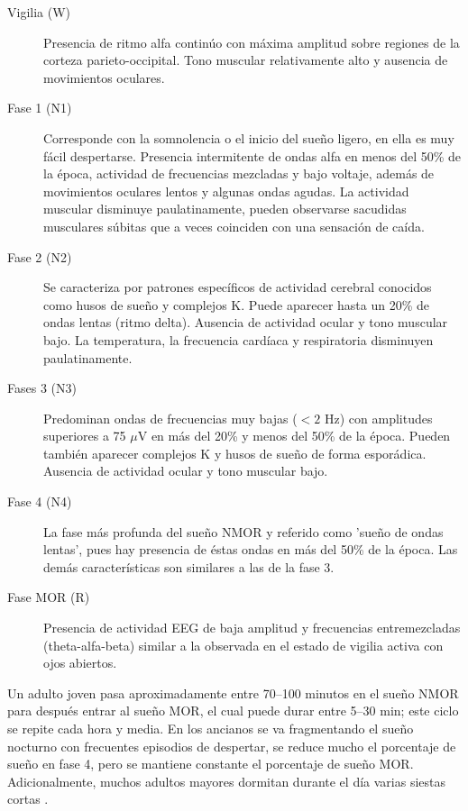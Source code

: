 \begin{description}
\item[Vigilia (W)] Presencia de ritmo alfa contin\'uo con m\'axima amplitud sobre regiones de la 
corteza parieto-occipital. Tono muscular relativamente alto y ausencia de movimientos oculares.

\item[Fase 1 (N1)] Corresponde con la somnolencia o el inicio del sue\~no ligero, en ella es muy 
f\'acil despertarse. 
Presencia intermitente de ondas alfa en menos del 50\% de la \'epoca, actividad de frecuencias 
mezcladas y bajo voltaje, adem\'as de movimientos oculares lentos y algunas ondas agudas. 
La actividad muscular disminuye paulatinamente, pueden observarse sacudidas musculares s\'ubitas 
que a veces coinciden con una sensaci\'on de ca\'ida. 

\item[Fase 2 (N2)] Se caracteriza por patrones espec\'ificos de actividad cerebral conocidos como 
husos de sue\~no y complejos K. 
Puede aparecer hasta un 20\% de ondas lentas (ritmo delta). Ausencia de actividad ocular y tono 
muscular bajo.
La temperatura, la frecuencia card\'iaca y respiratoria disminuyen paulatinamente. 

\item[Fases 3 (N3)] Predominan ondas de frecuencias muy bajas ($<2$ Hz) con amplitudes superiores a 
75 $\mu$V en m\'as del 20\% y menos del 50\% de la \'epoca. Pueden tambi\'en aparecer complejos K y 
husos de sue\~no de forma espor\'adica. Ausencia de actividad ocular y tono muscular bajo.

\item[Fase 4 (N4)] La fase m\'as profunda del sue\~no NMOR y referido como 'sue\~no de ondas 
lentas', pues hay presencia de \'estas ondas en m\'as del 50\% de la \'epoca. Las dem\'as 
caracter\'isticas son similares a las de la fase 3.

\item[Fase MOR (R)] Presencia de actividad EEG de baja amplitud y frecuencias entremezcladas 
(theta-alfa-beta) similar a la observada en el estado de vigilia activa con ojos abiertos.
\end{description}

Un adulto joven pasa aproximadamente entre 70--100 minutos en el sue\~no NMOR para despu\'es entrar 
al sue\~no MOR, el cual puede durar entre 5--30 min; este ciclo se repite cada hora y media.
En los ancianos se va fragmentando el sue\~no nocturno con frecuentes episodios de despertar, se 
reduce mucho el porcentaje de sue\~no en fase 4, pero se mantiene constante el porcentaje de 
sue\~no MOR. Adicionalmente, muchos adultos mayores dormitan durante el d\'ia varias siestas cortas 
\cite{CarrilloMora}.

